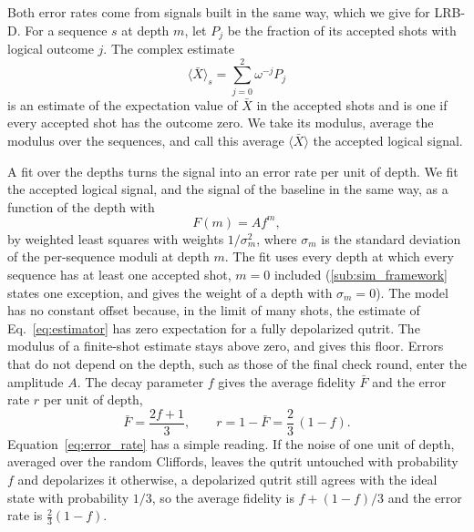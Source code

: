 Both error rates come from signals built in the same way, which we give for LRB-D. For a sequence $s$ at depth $m$, let $P_j$ be the fraction of its accepted shots with logical outcome $j$. The complex estimate
\begin{equation}
    \langle \bar{X} \rangle_s = \sum_{j=0}^{2} \omega^{-j} P_j
    \label{eq:estimator}
\end{equation}
is an estimate of the expectation value of $\bar X$ in the accepted shots and is one if every accepted shot has the outcome zero. We take its modulus, average the modulus over the sequences, and call this average $\langle \bar{X} \rangle$ the accepted logical signal.

A fit over the depths turns the signal into an error rate per unit of depth. We fit the accepted logical signal, and the signal of the baseline in the same way, as a function of the depth with
\begin{equation}
    F(m) = A f^{m},
    \label{eq:zero_offset_fit}
\end{equation}
by weighted least squares with weights $1/\sigma_m^2$, where $\sigma_m$ is the standard deviation of the per-sequence moduli at depth $m$. The fit uses every depth at which every sequence has at least one accepted shot, $m = 0$ included (\autoref{sub:sim_framework} states one exception, and  gives the weight of a depth with $\sigma_m = 0$). The model has no constant offset because, in the limit of many shots, the estimate of Eq.~\eqref{eq:estimator} has zero expectation for a fully depolarized qutrit. The modulus of a finite-shot estimate stays above zero, and  gives this floor. Errors that do not depend on the depth, such as those of the final check round, enter the amplitude $A$. The decay parameter $f$ gives the average fidelity $\bar F$ and the error rate $r$ per unit of depth,
\begin{equation}
    \bar{F} = \frac{2f + 1}{3}, \qquad r = 1 - \bar{F} = \frac{2}{3}\,(1 - f) .
    \label{eq:error_rate}
\end{equation}
Equation~\eqref{eq:error_rate} has a simple reading. If the noise of one unit of depth, averaged over the random Cliffords, leaves the qutrit untouched with probability $f$ and depolarizes it otherwise, a depolarized qutrit still agrees with the ideal state with probability $1/3$, so the average fidelity is $f + (1-f)/3$ and the error rate is $\tfrac{2}{3}(1 - f)$.

